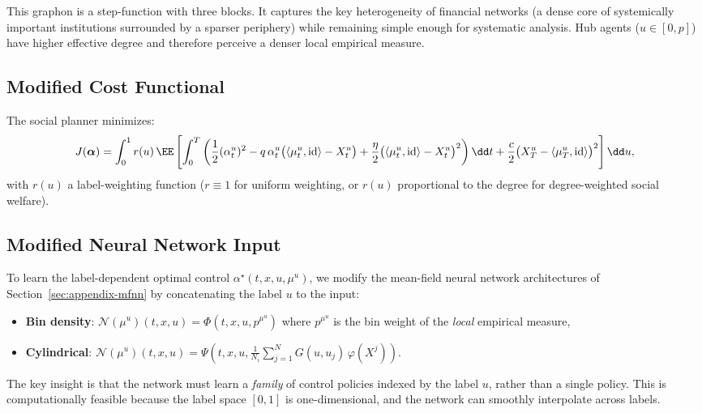 \documentclass[11pt]{article}
\begin{document}
\begin{remark}
  This graphon is a step-function with three blocks. It captures the key heterogeneity of financial networks (a dense core of systemically important institutions surrounded by a sparser periphery) while remaining simple enough for systematic analysis. Hub agents ($u \in [0,p]$) have higher effective degree and therefore perceive a denser local empirical measure.
\end{remark}

\subsection{Modified Cost Functional}

The social planner minimizes:
\begin{equation}\label{eq:hetero-cost}
  J(\boldsymbol{\alpha}) = \int_0^1 r(u)\,\EE\left[\int_0^T \left(\frac{1}{2}(\alpha_t^u)^2 - q\,\alpha_t^u\big(\langle \mu_t^u, \mathrm{id}\rangle - X_t^u\big) + \frac{\eta}{2}\big(\langle \mu_t^u, \mathrm{id}\rangle - X_t^u\big)^2\right)\dd t + \frac{c}{2}\big(X_T^u - \langle \mu_T^u, \mathrm{id}\rangle\big)^2\right]\dd u,
\end{equation}
with $r(u)$ a label-weighting function (\eg $r \equiv 1$ for uniform weighting, or $r(u)$ proportional to the degree for degree-weighted social welfare).

\subsection{Modified Neural Network Input}

To learn the label-dependent optimal control $\alpha^\star(t, x, u, \mu^u)$, we modify the mean-field neural network architectures of Section~\ref{sec:appendix-mfnn} by concatenating the label $u$ to the input:
\begin{itemize}
  \item \textbf{Bin density}: $\mathcal{N}(\mu^u)(t, x, u) = \Phi(t, x, u, p^{\mu^u})$ where $p^{\mu^u}$ is the bin weight of the \emph{local} empirical measure,
  \item \textbf{Cylindrical}: $\mathcal{N}(\mu^u)(t, x, u) = \Psi\!\left(t, x, u, \frac{1}{N_i}\sum_{j=1}^N G(u, u_j)\,\varphi(X^j)\right)$.
\end{itemize}

The key insight is that the network must learn a \emph{family} of control policies indexed by the label $u$, rather than a single policy. This is computationally feasible because the label space $[0,1]$ is one-dimensional, and the network can smoothly interpolate across labels.
\end{document}
